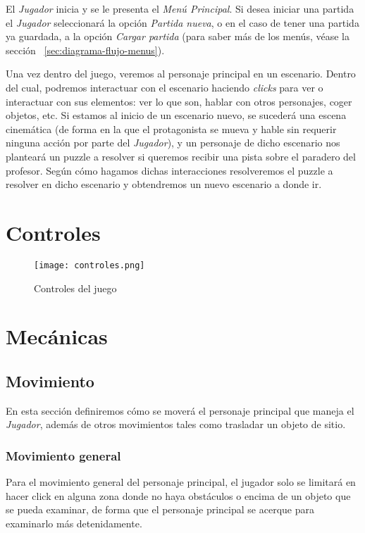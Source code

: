         El \emph{Jugador} inicia \nombrejuego y se le presenta el \emph{Menú Principal}. Si desea iniciar una partida el \emph{Jugador} seleccionará la opción \emph{Partida nueva}, o en el caso de tener una partida ya guardada, a la opción \emph{Cargar partida} (para saber más de los menús, véase la sección ~\ref{sec:diagrama-flujo-menus}).
        
        Una vez dentro del juego, veremos al personaje principal en un escenario. Dentro del cual, podremos interactuar con el escenario haciendo \emph{clicks} para ver o interactuar con sus elementos: ver lo que son, hablar con otros personajes, coger objetos, etc. Si estamos al inicio de un escenario nuevo, se sucederá una escena cinemática (de forma en la que el protagonista se mueva y hable sin requerir ninguna acción por parte del \emph{Jugador}), y un personaje de dicho escenario nos planteará un puzzle a resolver si queremos recibir una pista sobre el paradero del profesor. Según cómo hagamos dichas interacciones resolveremos el puzzle a resolver en dicho escenario y obtendremos un nuevo escenario a donde ir.
    
    \section{Controles}
        
        \begin{figure}[H] 
			\begin{center}
				\texttt{[image: controles.png]}
			\end{center}
			\caption{Controles del juego}
			\label{fig:controles}
		\end{figure}
    
    \section{Mecánicas}
        
        \subsection{Movimiento}
        En esta sección definiremos cómo se moverá el personaje principal que maneja el \emph{Jugador}, además de otros movimientos tales como trasladar un objeto de sitio.
            
            \subsubsection{Movimiento general}
            Para el movimiento general del personaje principal, el jugador solo se limitará en hacer click en alguna zona donde no haya obstáculos o encima de un objeto que se pueda examinar, de forma que el personaje principal se acerque para examinarlo más detenidamente.
            
